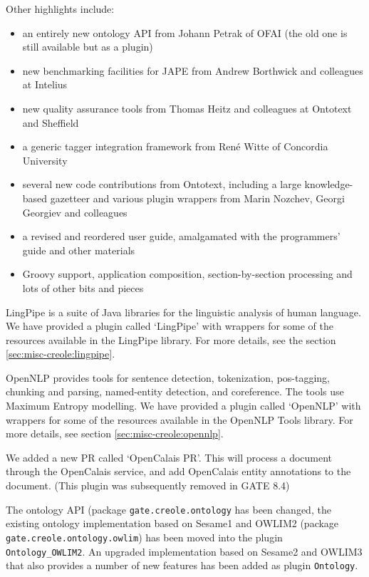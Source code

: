 Other highlights include:
\begin{itemize}
\item
an entirely new ontology API from Johann Petrak of OFAI (the old one is still
available but as a plugin)
\item
new benchmarking facilities for JAPE from Andrew Borthwick and colleagues at
Intelius
\item
new quality assurance tools from Thomas Heitz and colleagues at Ontotext and
Sheffield 
\item
a generic tagger integration framework from Ren\'e Witte of Concordia University
\item
several new code contributions from Ontotext, including a large
knowledge-based gazetteer and various plugin wrappers from Marin Nozchev,
Georgi Georgiev and colleagues
\item
a revised and reordered user guide, amalgamated with the programmers' guide
and other materials
\item
Groovy support, application composition, section-by-section processing and
lots of other bits and pieces
\end{itemize}



LingPipe is a suite of Java libraries for the linguistic analysis of human
language.  We have provided a plugin called `LingPipe' with wrappers for some 
of the resources available in the LingPipe library. For more details, see the 
section \ref{sec:misc-creole:lingpipe}.


OpenNLP provides tools for sentence detection, tokenization, pos-tagging,
chunking and parsing, named-entity detection, and coreference. The tools use
Maximum Entropy modelling. We have provided a plugin called `OpenNLP' with
wrappers for some of the resources available in the OpenNLP Tools library. For
more details, see section \ref{sec:misc-creole:opennlp}.


We added a new PR called `OpenCalais PR'. This will process a document
through the OpenCalais service, and add OpenCalais entity annotations to the
document. (This plugin was subsequently removed in GATE 8.4)


The ontology API (package \verb!gate.creole.ontology! has been changed, the 
existing ontology implementation based on Sesame1 and OWLIM2 
(package \verb!gate.creole.ontology.owlim!) has been moved into 
the plugin \verb!Ontology_OWLIM2!. An upgraded implementation 
based on Sesame2 and OWLIM3 that also provides a number of new 
features has been added as plugin \verb!Ontology!. 

